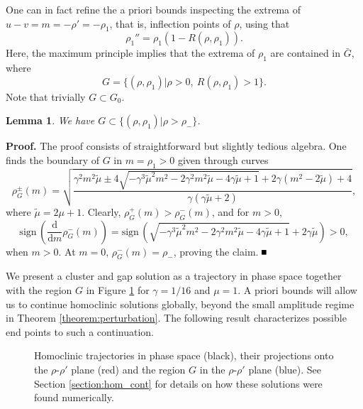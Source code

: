 \documentclass[10pt]{article}
\newtheorem{Lemma}{Lemma}[section]
\newenvironment{Proof}%
 {\begin{trivlist} \item[]{\bf Proof. }}%
 {\hspace*{\fill}$\rule{.4\baselineskip}{.4\baselineskip}$\end{trivlist}}
\newcommand{\rmd}{\mathrm{d}}
\begin{document}
One can in fact refine the a priori bounds inspecting the extrema of $u-v=m=-\rho'=-\rho_1$, that is, inflection points of $\rho$, using that
\[
 \rho_1''=\rho_1\left(1-R(\rho,\rho_1)\right).
\]
Here, the maximum principle implies that the extrema of $\rho_1$ are contained in $\bar{G}$, where 
\begin{equation}\label{e:g}
 G=\{(\rho,\rho_1)| \rho>0,\ R(\rho,\rho_1)>1\}.
\end{equation}
Note that trivially $G\subset G_0$. 
\begin{Lemma}\label{l:g}
 We have $G\subset \{(\rho,\rho_1)|\rho>\rho_-\}$.
\end{Lemma}
\begin{Proof}
 The proof consists of straightforward but slightly tedious algebra. One finds the boundary of $G$ in $m=\rho_1>0$ given through curves
 \begin{equation}
\rho_G^\pm(m)=
   \sqrt{\frac{\gamma^2 m^2 \tilde{\mu}\pm 4
   \sqrt{-\gamma^3 \tilde{\mu}^2m^2-2 \gamma^2 m^2 \tilde{\mu}-4 \gamma \tilde{\mu}+1}+2 \gamma \left(m^2-2\tilde{\mu}\right)+4}{\gamma ( \gamma \tilde{\mu}+2)}},
 \end{equation}
where $\tilde{\mu}=2\mu+1$. Clearly, $\rho_G^+(m)>\rho_G^-(m)$, and for $m>0$, 
\[
\mathrm{sign}\,\left( \frac{\rmd}{\rmd m}\rho_G^-(m)\right)=\mathrm{sign}\, \left(\sqrt{-\gamma^3\tilde{\mu}^2 m^2-2
   \gamma^2 m^2\tilde{\mu}-4 \gamma\tilde{\mu}+1}+2\gamma\tilde{\mu} \right)
>0,
\]
when $m>0$. At $m=0$, $\rho_G^-(m)= \rho_-$, proving the claim.
   \end{Proof}

We present a cluster and gap solution as a trajectory in phase space together with the region $G$ in Figure \ref{fig:phase} for $\gamma = 1/16$ and $\mu = 1$. A priori bounds will allow us to continue homoclinic solutions globally, beyond the small amplitude regime in Theorem \ref{theorem:perturbation}. The following result characterizes possible end points to such a continuation. 



\begin{figure}[H]
\def\svgwidth{\columnwidth}

\caption{Homoclinic trajectories in phase space (black), their projections onto the $\rho$-$\rho'$ plane (red) and the region $G$ in the $\rho$-$\rho'$ plane (blue).  See Section \ref{section:hom_cont} for details on how these solutions were found numerically.}
\label{fig:phase}
\end{figure}
\end{document}

